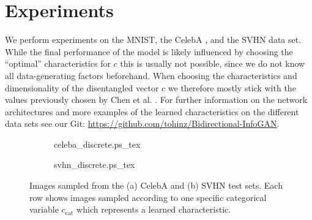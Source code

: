 \documentclass{esannV2}
\begin{document}
\section{Experiments}
We perform experiments on the MNIST, the CelebA \cite{Liu2015}, and the SVHN \cite{Netzer2011} data set. While the final performance of the model is likely influenced by choosing the ``optimal'' characteristics for $c$ this is usually not possible, since we do not know all data-generating factors beforehand. When choosing the characteristics and dimensionality of the disentangled vector $c$ we therefore mostly stick with the values previously chosen by Chen et al. \cite{Chen2016}.
For further information on the network architectures and more examples of the learned characteristics on the different data sets see our Git: \url{https://github.com/tohinz/Bidirectional-InfoGAN}.

\begin{figure}
\centering
\begin{subfigure}[b]{0.8\textwidth}
\begin{footnotesize}
\def\svgwidth{\linewidth}
\def\svgscale{0.5}
{celeba_discrete.ps_tex}
\end{footnotesize}
\vspace{-0.6cm}
\caption{}
\label{fig:celeba}
\end{subfigure}

\begin{subfigure}[b]{0.8\textwidth}
\begin{footnotesize}
\def\svgwidth{\linewidth}
\def\svgscale{0.5}
{svhn_discrete.ps_tex}
\end{footnotesize}
\vspace{-0.6cm}
\caption{}
\label{fig:svhn}
\end{subfigure}

\caption{Images sampled from the (a) CelebA and (b) SVHN test sets. Each row shows images sampled according to one specific categorical variable $c_{\text{cat}}$ which represents a learned characteristic.}
\vspace{-0.3cm}
\label{fig:celeba:svhn}
\end{figure}
\end{document}
